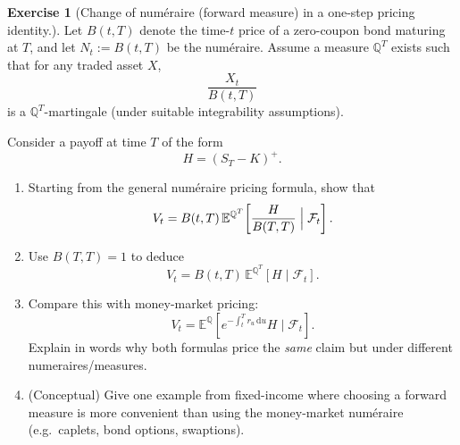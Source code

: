 \documentclass[11pt]{article}
\newcommand{\E}{\mathbb{E}}
\newcommand{\F}{\mathcal{F}}
\newcommand{\1}{\mathbf{1}}
\theoremstyle{definition}
\newtheorem{exercise}{Exercise}[section]
\begin{document}
\begin{exercise}[Change of num\'eraire (forward measure) in a one-step pricing identity.]
Let $B(t,T)$ denote the time-$t$ price of a zero-coupon bond maturing at $T$, and let $N_t:=B(t,T)$ be the num\'eraire.
Assume a measure $\mathbb{Q}^T$ exists such that for any traded asset $X$,
$$
\frac{X_t}{B(t,T)}
$$
is a $\mathbb{Q}^T$-martingale (under suitable integrability assumptions).

Consider a payoff at time $T$ of the form
$$
H=(S_T-K)^+.
$$

\begin{enumerate}[leftmargin=1.2em, label=(\alph*), itemsep=0.3em]
\item Starting from the general num\'eraire pricing formula, show that
$$
V_t = B(t,T)\,\E^{\mathbb{Q}^T}\!\left[\frac{H}{B(T,T)}\Bigm|\F_t\right].
$$

\item Use $B(T,T)=1$ to deduce
$$
V_t = B(t,T)\,\E^{\mathbb{Q}^T}\!\left[H\mid\F_t\right].
$$

\item Compare this with money-market pricing:
$$
V_t=\E^{\mathbb{Q}}\!\left[e^{-\int_t^T r_u\,\mathrm{d}u}H\mid\F_t\right].
$$
Explain in words why both formulas price the \emph{same} claim but under different numeraires/measures.

\item (Conceptual) Give one example from fixed-income where choosing a forward measure is more convenient than using the money-market num\'eraire (e.g.\ caplets, bond options, swaptions).
\end{enumerate}
\end{exercise}
\end{document}
